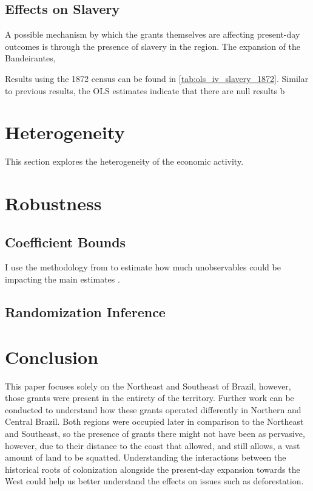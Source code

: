 \documentclass{article}
\begin{document}
\subsection{Effects on Slavery}

A possible mechanism by which the grants themselves are affecting present-day outcomes is through the presence of slavery in the region. 
The expansion of the Bandeirantes, 

Results using the 1872 census can be found in \autoref{tab:ols_iv_slavery_1872}.
Similar to previous results, the OLS estimates indicate that there are null results b


\section{Heterogeneity}

This section explores the heterogeneity of the economic activity. 


\section{Robustness}
\subsection{Coefficient Bounds}

I use the methodology from to estimate how much unobservables could be impacting the main estimates \textcite{Masten2022-bg}.

\subsection{Randomization Inference}

\section{Conclusion}

This paper focuses solely on the Northeast and Southeast of Brazil, however, those grants were present in the entirety of the territory.
Further work can be conducted to understand how these grants operated differently in Northern and Central Brazil. 
Both regions were occupied later in comparison to the Northeast and Southeast, so the presence of grants there might not have been as pervasive, however, due to their distance to the coast that allowed, and still allows, a vast amount of land to be squatted. 
Understanding the interactions between the historical roots of colonization alongside the present-day expansion towards the West could help us better understand the effects on issues such as deforestation. 
\end{document}
